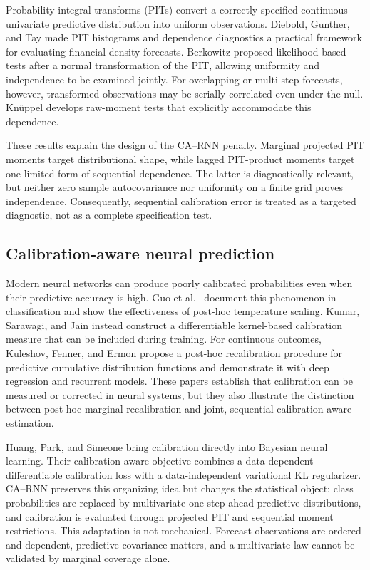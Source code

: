 \documentclass[11pt]{article}
\begin{document}
Probability integral transforms (PITs) convert a correctly specified continuous
univariate predictive distribution into uniform observations.  Diebold,
Gunther, and Tay \cite{diebold1998density} made PIT histograms and dependence
diagnostics a practical framework for evaluating financial density forecasts.
Berkowitz \cite{berkowitz2001testing} proposed likelihood-based tests after a
normal transformation of the PIT, allowing uniformity and independence to be
examined jointly.  For overlapping or multi-step forecasts, however, transformed
observations may be serially correlated even under the null.  Kn\"uppel
\cite{knuppel2015multistep} develops raw-moment tests that explicitly accommodate
this dependence.

These results explain the design of the CA--RNN penalty.  Marginal projected PIT
moments target distributional shape, while lagged PIT-product moments target one
limited form of sequential dependence.  The latter is diagnostically relevant,
but neither zero sample autocovariance nor uniformity on a finite grid proves
independence.  Consequently, sequential calibration error is treated as a
targeted diagnostic, not as a complete specification test.

\subsection{Calibration-aware neural prediction}

Modern neural networks can produce poorly calibrated probabilities even when
their predictive accuracy is high.  Guo et al.\ \cite{guo2017calibration}
document this phenomenon in classification and show the effectiveness of
post-hoc temperature scaling.  Kumar, Sarawagi, and Jain
\cite{kumar2018trainable} instead construct a differentiable kernel-based
calibration measure that can be included during training.  For continuous
outcomes, Kuleshov, Fenner, and Ermon \cite{kuleshov2018regression} propose a
post-hoc recalibration procedure for predictive cumulative distribution
functions and demonstrate it with deep regression and recurrent models.  These
papers establish that calibration can be measured or corrected in neural
systems, but they also illustrate the distinction between post-hoc marginal
recalibration and joint, sequential calibration-aware estimation.

Huang, Park, and Simeone \cite{huang2024cabl} bring calibration directly into
Bayesian neural learning.  Their calibration-aware objective combines a
data-dependent differentiable calibration loss with a data-independent
variational KL regularizer.  CA--RNN preserves this organizing idea but changes
the statistical object: class probabilities are replaced by multivariate
one-step-ahead predictive distributions, and calibration is evaluated through
projected PIT and sequential moment restrictions.  This adaptation is not
mechanical.  Forecast observations are ordered and dependent, predictive
covariance matters, and a multivariate law cannot be validated by marginal
coverage alone.
\end{document}
